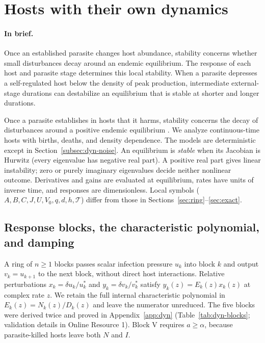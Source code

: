 \section{Hosts with their own dynamics}\label{sec:dyn}

\paragraph{In brief.}
Once an established parasite changes host abundance, stability concerns whether small disturbances decay around an endemic equilibrium. The response of each host and parasite stage determines this local stability. When a parasite depresses a self-regulated host below the density of peak production, intermediate external-stage durations can destabilize an equilibrium that is stable at shorter and longer durations.

Once a parasite establishes in hosts that it harms, stability concerns the decay of disturbances around a positive endemic equilibrium \citep{anderson1978,dobson2020}. We analyze continuous-time hosts with births, deaths, and density dependence. The models are deterministic except in Section~\ref{subsec:dyn-noise}. An equilibrium is \emph{stable} when its Jacobian is Hurwitz (every eigenvalue has negative real part). A positive real part gives linear instability; zero or purely imaginary eigenvalues decide neither nonlinear outcome. Derivatives and gains are evaluated at equilibrium, rates have units of inverse time, and responses are dimensionless. Local symbols ($A, B, C, J, U, V_0, q, d, h, \mathcal{T}$) differ from those in Sections~\ref{sec:ring}--\ref{sec:exact}.

\subsection{Response blocks, the characteristic polynomial, and damping}\label{subsec:dyn-blocks}

A ring of $n\ge1$ blocks passes scalar infection pressure $u_k$ into block $k$ and output $v_k=u_{k+1}$ to the next block, without direct host interactions. Relative perturbations $x_k=\delta u_k/u_k^*$ and $y_k=\delta v_k/v_k^*$ satisfy $y_k(z)=E_k(z)x_k(z)$ at complex rate $z$. We retain the full internal characteristic polynomial in $E_k(z)=N_k(z)/D_k(z)$ and leave the numerator unreduced. The five blocks were derived twice and proved in Appendix~\ref{app:dyn} (Table~\ref{tab:dyn-blocks}; validation details in Online Resource 1). Block V requires $a\ge\alpha$, because parasite-killed hosts leave both $N$ and $I$.

